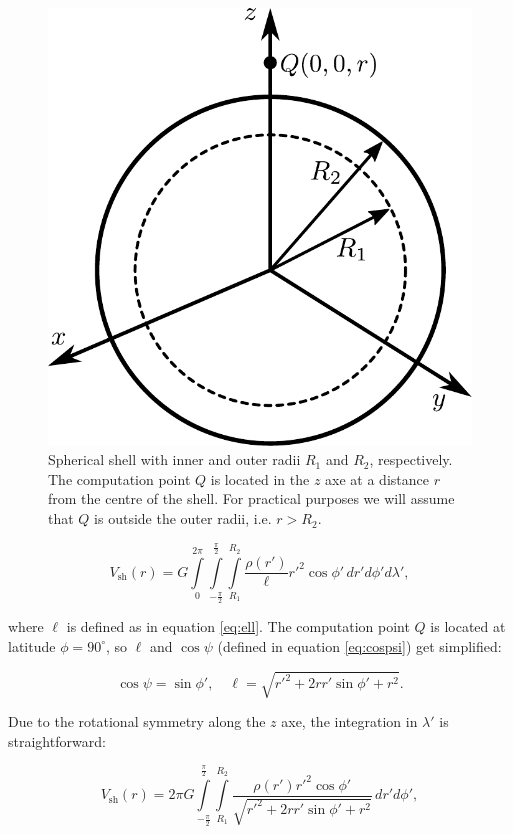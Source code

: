\documentclass[extra]{gji}
\begin{document}
\begin{figure}
\centering
\includegraphics[width=0.7\linewidth]{figures/spherical-shell.pdf}
\caption{
Spherical shell with inner and outer radii $R_1$ and $R_2$, respectively.
The computation point $Q$ is located in the $z$ axe at a distance $r$ from the centre of the shell.
For practical purposes we will assume that $Q$ is outside the outer radii, i.e. $r > R_2$.
}
\label{fig:spherical-shell}
\end{figure}

\begin{equation}
    V_\text{sh}(r) = G 
    \int\limits_0^{2\pi}
    \int\limits_{-\frac{\pi}{2}}^\frac{\pi}{2}
    \int\limits_{R_1}^{R_2}
    \frac{\rho(r')}{\ell} {r'}^2 \cos\phi' \, 
    dr' d\phi' d\lambda',
\end{equation}

\noindent where $\ell$ is defined as in equation \ref{eq:ell}.
The computation point $Q$ is located at latitude $\phi=90^\circ$, so $\ell$ and $\cos\psi$ (defined in equation \ref{eq:cospsi}) get simplified:

\begin{equation}
    \cos\psi = \sin\phi', \quad
    \ell = \sqrt{r'^2 + 2 r r' \sin\phi' + r^2}.
\end{equation}

Due to the rotational symmetry along the $z$ axe, the integration in $\lambda'$ is straightforward:

\begin{equation}
    V_\text{sh}(r) = 2\pi G 
    \int\limits_{-\frac{\pi}{2}}^\frac{\pi}{2}
    \int\limits_{R_1}^{R_2}
    \frac{\rho(r') {r'}^2 \cos\phi'}{\sqrt{r'^2 + 2 r r' \sin\phi' + r^2}}
    \, dr' d\phi',
\end{equation}
\end{document}
